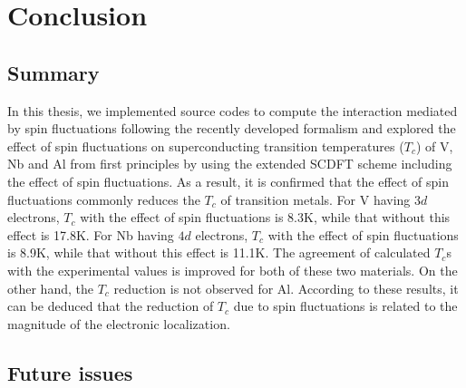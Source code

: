 

%
%
\chapter{Conclusion}
\label{conclusion}

\section{Summary}
In this thesis, we implemented source codes to compute the interaction mediated by spin fluctuations
following the recently developed formalism\cite{Essenberger2014}
and explored the effect of spin fluctuations on superconducting transition temperatures ($T_c$)
of V, Nb and Al from first principles by using the extended SCDFT scheme including the effect of 
spin fluctuations\cite{Essenberger2014}.
As a result, it is confirmed that the effect of spin fluctuations commonly
reduces the $T_c$ of transition metals. 
For V having $3d$ electrons, $T_c$ with the effect of spin fluctuations is 8.3K, while that 
without this effect is 17.8K.
For Nb having $4d$ electrons, $T_c$ with the effect of spin fluctuations is 8.9K, while that 
without this effect is 11.1K.
The agreement of calculated $T_c$s with the experimental values is improved for both of these 
two materials. On the other hand, the $T_c$ reduction is not observed for Al.
According to these results, it can be deduced that the reduction of $T_c$ due to spin fluctuations
is related to the magnitude of the electronic localization.

\section{Future issues}

